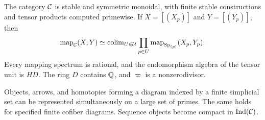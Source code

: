 \begin{proposition}\label{found:ultraproduct}
The category $\mathcal C$ is stable and symmetric monoidal, with finite
stable constructions and tensor products computed primewise.  If
$X=[(X_p)]$ and $Y=[(Y_p)]$, then
\begin{equation}\label{eq:found-mapping-spectrum}
 \operatorname{map}_{\mathcal C}(X,Y)
  \simeq\operatorname{colim}_{U\in\mathcal U}\prod_{p\in U}
                   \operatorname{map}_{\mathrm{Sp}_{(p)}}(X_p,Y_p).
\end{equation}
Every mapping spectrum is rational, and the endomorphism algebra of
the tensor unit is $HD$.  The ring $D$ contains $\mathbb Q$, and $\varpi$ is
a nonzerodivisor.

Objects, arrows, and homotopies forming a diagram indexed by a finite
simplicial set can be represented simultaneously on a large set of
primes.  The same holds for specified finite cofiber diagrams.  Sequence
objects become compact in $\mathrm{Ind}(\mathcal C)$.
\end{proposition}

